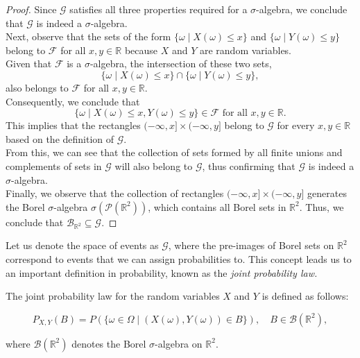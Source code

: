 \begin{proof}
    Since \( \mathcal{G} \) satisfies all three properties required for a \( \sigma \)-algebra, we conclude that \( \mathcal{G} \) is indeed a \( \sigma \)-algebra.\\

    Next, observe that the sets of the form \( \{ \omega \mid X(\omega) \leq x \} \) and \( \{ \omega \mid Y(\omega) \leq y \} \) belong to \( \mathcal{F} \) for all \( x, y \in \mathbb{R} \) because \( X \) and \( Y \) are random variables.\\

    Given that \( \mathcal{F} \) is a \( \sigma \)-algebra, the intersection of these two sets,
    \[
    \{ \omega \mid X(\omega) \leq x \} \cap \{ \omega \mid Y(\omega) \leq y \},
    \]
    also belongs to \( \mathcal{F} \) for all \( x, y \in \mathbb{R} \).\\

    Consequently, we conclude that 
    \[
    \{ \omega \mid X(\omega) \leq x, Y(\omega) \leq y \} \in \mathcal{F} \text{ for all } x, y \in \mathbb{R}.
    \]
    This implies that the rectangles \( (-\infty, x] \times (-\infty, y] \) belong to \( \mathcal{G} \) for every \( x, y \in \mathbb{R} \) based on the definition of \( \mathcal{G} \).\\

    From this, we can see that the collection of sets formed by all finite unions and complements of sets in \( \mathcal{G} \) will also belong to \( \mathcal{G} \), thus confirming that \( \mathcal{G} \) is indeed a \( \sigma \)-algebra.\\

    Finally, we observe that the collection of rectangles \( (-\infty, x] \times (-\infty, y] \) generates the Borel \( \sigma \)-algebra \( \sigma(\mathcal{P}(\mathbb{R}^2)) \), which contains all Borel sets in \( \mathbb{R}^2 \). Thus, we conclude that \( \mathcal{B}_{\mathbb{R}^2} \subseteq \mathcal{G} \).
\end{proof}

Let us denote the space of events as \(\mathcal{G}\), where the pre-images of Borel sets on \(\mathbb{R}^2\) correspond to events that we can assign probabilities to. This concept leads us to an important definition in probability, known as the \textit{joint probability law.}

\begin{definition}
    The joint probability law for the random variables \(X\) and \(Y\) is defined as follows:

\[
P_{X,Y}(B) = P(\{\omega \in \Omega \mid (X(\omega), Y(\omega)) \in B\}), \quad B \in \mathcal{B}(\mathbb{R}^2),
\]

where \(\mathcal{B}(\mathbb{R}^2)\) denotes the Borel \(\sigma\)-algebra on \(\mathbb{R}^2\). 
\end{definition}


